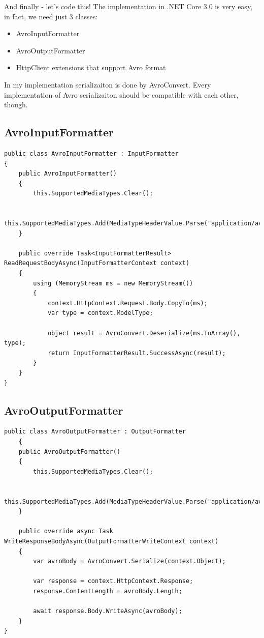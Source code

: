 \documentclass[]{article}
\begin{document}
And finally - let's code this! The implementation in .NET Core 3.0 is very easy, in fact, we need just 3 classes: 

\begin{itemize}
	\item AvroInputFormatter
	\item AvroOutputFormatter
	\item HttpClient extensions that support Avro format
\end{itemize}

In my implementation serializaiton is done by AvroConvert. Every implementation of Avro serializaiton should be compatible with each other, though.

\subsection{AvroInputFormatter}

\begin{lstlisting}[language={[Sharp]C}, label={Script}]
public class AvroInputFormatter : InputFormatter
{
	public AvroInputFormatter()
	{
		this.SupportedMediaTypes.Clear();
		
		this.SupportedMediaTypes.Add(MediaTypeHeaderValue.Parse("application/avro"));
	}
	
	public override Task<InputFormatterResult> ReadRequestBodyAsync(InputFormatterContext context)
	{
		using (MemoryStream ms = new MemoryStream())
		{
			context.HttpContext.Request.Body.CopyTo(ms);
			var type = context.ModelType;
			
			object result = AvroConvert.Deserialize(ms.ToArray(), type);
			return InputFormatterResult.SuccessAsync(result);
		}
	}
}
\end{lstlisting}

\subsection{AvroOutputFormatter}

\begin{lstlisting}[language={[Sharp]C}, label={Script}]
public class AvroOutputFormatter : OutputFormatter
	{
	public AvroOutputFormatter()
	{
		this.SupportedMediaTypes.Clear();
		
		this.SupportedMediaTypes.Add(MediaTypeHeaderValue.Parse("application/avro"));
	}
	
	public override async Task WriteResponseBodyAsync(OutputFormatterWriteContext context)
	{
		var avroBody = AvroConvert.Serialize(context.Object);
		
		var response = context.HttpContext.Response;
		response.ContentLength = avroBody.Length;
		
		await response.Body.WriteAsync(avroBody);
	}
}
\end{lstlisting}
\end{document}
